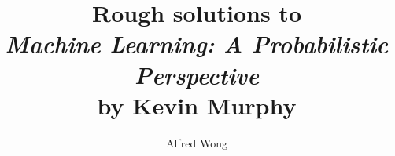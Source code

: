 \documentclass{article}
\title{Rough solutions to\\\textit{Machine Learning: A Probabilistic Perspective}\\by Kevin Murphy}
\author{Alfred Wong}
\date{\vspace{-\baselineskip}}
\begin{document}
\maketitle
\pagebreak
\tableofcontents
\pagebreak






\end{document}
